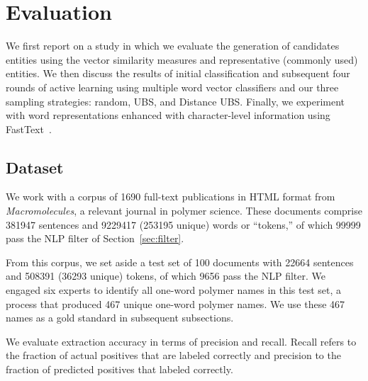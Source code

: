 \section{Evaluation}
\label{sect:apner_results}
We first report on a study in which we evaluate the generation of candidates entities using the vector similarity measures and representative (commonly used) entities. 
We then discuss the results of initial classification and subsequent four rounds of active learning using multiple word vector classifiers and our three sampling strategies: random, UBS, and Distance UBS.
Finally, we experiment with word representations enhanced with character-level information using FastText~\cite{bojanowski2016enriching,joulin2016bag}.

\subsection{Dataset}
We work with a corpus of \num{1690} full-text publications in HTML format from \textit{Macromolecules}, 
a relevant journal in polymer science.
These documents comprise \num{381947} sentences and \num{9229417} (\num{253195} unique) words or ``tokens,''
of which \num{99999} pass the NLP filter of Section~\ref{sec:filter}.

From this corpus, 
we set aside a test set of 100 documents with  \num{22664} sentences and \num{508391} (\num{36293} unique) tokens,
of which \num{9656} pass the NLP filter.
We engaged six experts to identify all one-word polymer names in this test set,
a process that produced 467 unique one-word polymer names.
We use these 467 names as a gold standard in subsequent subsections.

We evaluate extraction accuracy in terms of precision and recall.
Recall refers to the fraction of actual positives that
are labeled correctly and precision to the fraction of predicted
positives that labeled correctly.

